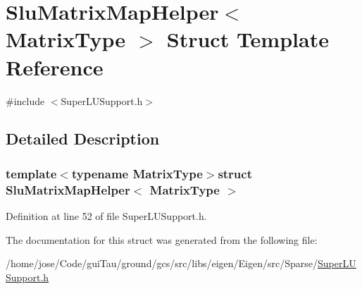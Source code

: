 \hypertarget{struct_slu_matrix_map_helper}{\section{Slu\-Matrix\-Map\-Helper$<$ Matrix\-Type $>$ Struct Template Reference}
\label{struct_slu_matrix_map_helper}
}


{\ttfamily \#include $<$Super\-L\-U\-Support.\-h$>$}



\subsection{Detailed Description}
\subsubsection*{template$<$typename Matrix\-Type$>$struct Slu\-Matrix\-Map\-Helper$<$ Matrix\-Type $>$}



Definition at line 52 of file Super\-L\-U\-Support.\-h.



The documentation for this struct was generated from the following file\-:\begin{DoxyCompactItemize}
\item 
/home/jose/\-Code/gui\-Tau/ground/gcs/src/libs/eigen/\-Eigen/src/\-Sparse/\hyperlink{_super_l_u_support_8h}{Super\-L\-U\-Support.\-h}\end{DoxyCompactItemize}

